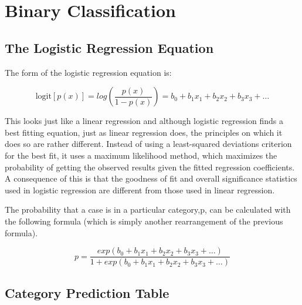 \documentclass[a4paper,12pt]{article}
\begin{document}
	
\section{Binary Classification}	


\subsection{The Logistic Regression Equation}
The form of the logistic regression equation is:
\begin{framed}
	\[ \mbox{logit}[p(x)] =  log \left(\frac{p(x)}{1-p(x)} \right) = b_0 + b_1x_1 + b_2x_2 + b_3x_3 + \ldots \]
\end{framed}
This looks just like a linear regression and although logistic regression finds a best
fitting equation, just as linear regression does, the principles on which it does so are
rather different. Instead of using a least-squared deviations criterion for the best fit, it
uses a maximum likelihood method, which maximizes the probability of getting the
observed results given the fitted regression coefficients. A consequence of this is that the
goodness of fit and overall significance statistics used in logistic regression are different
from those used in linear regression.

The probability that a case is in a particular category,p, can be calculated with the following formula (which is simply another rearrangement of the previous formula).

\[p = \frac{exp(b_0 + b_1x_1 + b_2x_2 + b_3x_3 + \ldots)}{1 + exp(b_0 + b_1x_1 + b_2x_2 + b_3x_3 + \ldots)}\]

\newpage



\subsection{Category Prediction Table}
\end{document}

